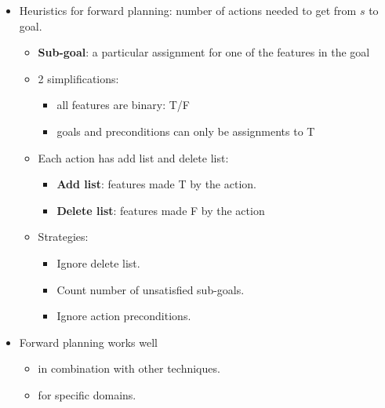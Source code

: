 \documentclass{article}
\begin{document}
\begin{itemize}
\begin{multicols}{2}
            Planning
            \begin{itemize}
                \item \textbf{State}: full assignments of values to features
                \item \textbf{Success function}: states reachable by applying actions with preconditions satisfied in the current state.
                \item \textbf{Goal test}: partial assignment of values to features.
                \item \textbf{Solution}: a sequence of actions.
                \item \textbf{Heuristic function} (see below)
            \end{itemize}
        \end{multicols}
        \item Heuristics for forward planning: number of actions needed to get from $s$ to goal.
            \begin{itemize}
                \item \textbf{Sub-goal}: a particular assignment for one of the features in the goal
                \item 2 simplifications:
                    \begin{itemize}
                        \item all features are binary: T/F
                        \item goals and preconditions can only be assignments to T
                    \end{itemize}
                \item Each action has add list and delete list:
                    \begin{itemize}
                        \item \textbf{Add list}: features made T by the action.
                        \item \textbf{Delete list}: features made F by the action
                    \end{itemize}
                \item Strategies:
                    \begin{itemize}
                        \item Ignore delete list.
                        \item Count number of unsatisfied sub-goals.
                        \item Ignore action preconditions.
                    \end{itemize}
            \end{itemize}
        \item Forward planning works well
            \begin{itemize}
                \item in combination with other techniques.
                \item for specific domains.
            \end{itemize}
\end{itemize}
\end{document}
